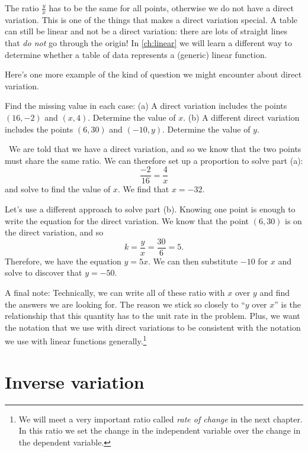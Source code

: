 The ratio $\frac{y}{x}$ has to be the same for all points, otherwise we do not have a direct variation. This is one of the things that makes a direct variation special. A table can still be linear and not be a direct variation: there are lots of straight lines that \textit{do not} go through the origin! In \cref{ch:linear} we will learn a different way to determine whether a table of data represents a (generic) linear function.

Here's one more example of the kind of question we might encounter about direct variation.

\begin{boxex}
Find the missing value in each case: (a) A direct variation includes the points $(16, -2)$ and $(x, 4)$. Determine the value of $x$. (b) A different direct variation includes the points $(6, 30)$ and $(-10, y)$. Determine the value of $y$.

\exsoln\ We are told that we have a direct variation, and so we know that the two points must share the same ratio. We can therefore set up a proportion to solve part (a):
\[\frac{-2}{16} = \frac{4}{x}\] and solve to find the value of $x$. We find that $x=-32$.

Let's use a different approach to solve part (b). Knowing one point is enough to write the equation for the direct variation. We know that the point $(6,30)$ is on the direct variation, and so \[k = \frac{y}{x} = \frac{30}{6} = 5.\] Therefore, we have the equation $y = 5x$. We can then substitute $-10$ for $x$ and solve to discover that $y=-50$.
\end{boxex}

A final note: Technically, we can write all of these ratio with $x$ over $y$ and find the answers we are looking for. The reason we stick so closely to ``$y$ over $x$'' is the relationship that this quantity has to the unit rate in the problem. Plus, we want the notation that we use with direct variations to be consistent with the notation we use with linear functions generally.\footnote{We will meet a very important ratio called \textit{rate of change} in the next chapter. In this ratio we set the change in the independent variable over the change in the dependent variable.}



\section{Inverse variation}
\label{sec:inversevar}


